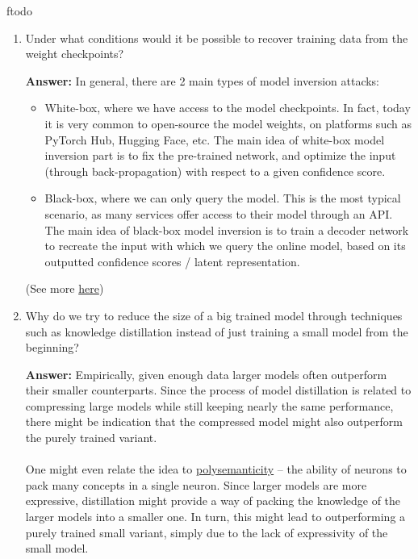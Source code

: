 ƒtodo\documentclass{article}
\newenvironment{QandA}{\begin{enumerate}[label=\arabic*.]}{\end{enumerate}}
\newenvironment{answer}{\par\normalfont \textbf{Answer:}}{}
\begin{document}
\begin{QandA}
    \item Under what conditions would it be possible to recover training data from the weight checkpoints?
    \begin{answer}
        In general, there are 2 main types of model inversion attacks:
        \begin{itemize}
            \item White-box, where we have access to the model checkpoints. In fact, today it is very common to open-source the model weights, on platforms such as PyTorch Hub, Hugging Face, etc. The main idea of white-box model inversion part is to fix the pre-trained network, and optimize the input (through back-propagation) with respect to a given confidence score.
            \item Black-box, where we can only query the model. This is the most typical scenario, as many services offer access to their model through an API. The main idea of black-box model inversion is to train a decoder network to recreate the input with which we query the online model, based on its outputted confidence scores / latent representation. 
        \end{itemize}
        
        (See more \href{https://blog.openmined.org/extracting-private-data-from-a-neural-network/}{here})
    \end{answer}

    \item Why do we try to reduce the size of a big trained model through techniques such as knowledge distillation instead of just training a small model from the beginning?
    \begin{answer}
        Empirically, given enough data larger models often outperform their smaller counterparts. Since the process of model distillation is related to compressing large models while still keeping nearly the same performance, there might be indication that the compressed model might also outperform the purely trained variant. \\\\
        One might even relate the idea to \href{https://twitter.com/AnthropicAI/status/1570087876053942272}{polysemanticity} -- the ability of neurons to pack many concepts in a single neuron. Since larger models are more expressive, distillation might provide a way of packing the knowledge of the larger models into a smaller one. In turn, this might lead to outperforming a purely trained small variant, simply due to the lack of expressivity of the small model. 
    \end{answer}
    
\end{QandA}
\end{document}
